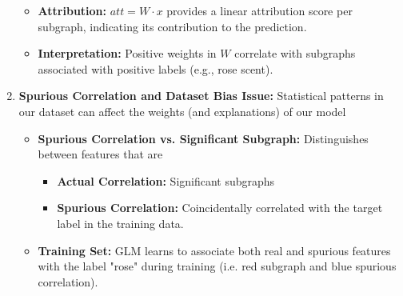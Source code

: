 \begin{example}
\begin{enumerate}
\begin{itemize}
\begin{itemize}
            \end{itemize}
            \item \textbf{Attribution:} \( att = W \cdot x \) provides a linear attribution score per subgraph, indicating its contribution to the prediction.
            \item \textbf{Interpretation:} Positive weights in \( W \) correlate with subgraphs associated with positive labels (e.g., rose scent).
        \end{itemize}        
        \newpage
        \item \textbf{Spurious Correlation and Dataset Bias Issue:} Statistical patterns in our dataset can affect the weights (and explanations) of our model
        \begin{itemize}            
            \item \textbf{Spurious Correlation vs. Significant Subgraph:} Distinguishes between features that are 
            \begin{itemize}
                \item \textbf{Actual Correlation:} Significant subgraphs
                \item \textbf{Spurious Correlation:} Coincidentally correlated with the target label in the training data.
            \end{itemize}
        
            \item \textbf{Training Set:} GLM learns to associate both real and spurious features with the label "rose" during training (i.e. red subgraph and blue spurious correlation).
        

\end{itemize}
\end{enumerate}
\end{example}
